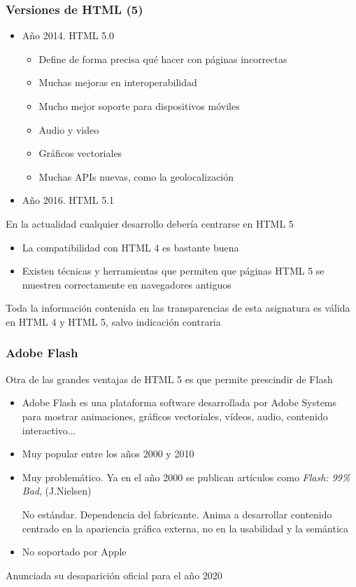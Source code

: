 \documentclass[ucs]{beamer}
\begin{document}
\begin{frame}[fragile]
\frametitle{Versiones de HTML (5)}
\begin{itemize}
\item
Año 2014. HTML 5.0

    \begin{itemize}
    \item
Define de forma precisa qué hacer con páginas incorrectas
    \item
Muchas mejoras en interoperabilidad
    \item
Mucho mejor soporte para dispositivos móviles
    \item
Audio y video
    \item
Gráficos vectoriales
    \item
Muchas APIs nuevas, como la geolocalización

    \end{itemize}
\item
Año 2016. HTML 5.1
\end{itemize}

En la actualidad cualquier desarrollo debería centrarse en HTML 5

    \begin{itemize}
    \item
La compatibilidad con HTML 4 es bastante buena
    \item
Existen técnicas y herramientas que permiten que páginas HTML 5 se
muestren correctamente en navegadores antiguos
    \end{itemize}
Toda la información contenida en las transparencias de esta asignatura es válida en HTML 4 y HTML 5, salvo
indicación contraria

\end{frame}



\begin{frame}[fragile]
\frametitle{Adobe Flash}
Otra de las grandes ventajas de HTML 5 es que permite prescindir de Flash
\begin{itemize}
\item
Adobe Flash es una plataforma software desarrollada por Adobe Systems
para mostrar animaciones, gráficos vectoriales, vídeos, audio, contenido
interactivo...

\item
Muy popular entre los años 2000 y 2010

\item
Muy problemático. 
Ya en el año 2000 se publican artículos como
\emph{Flash: 99\% Bad}, (J.Nielsen)


No estándar. Dependencia del fabricante.
Anima a desarrollar contenido centrado en la apariencia gráfica
externa, no en la usabilidad y la semántica 

\item
No soportado por Apple
\end{itemize}
Anunciada su desaparición oficial para el año 2020
\end{frame}
\end{document}
